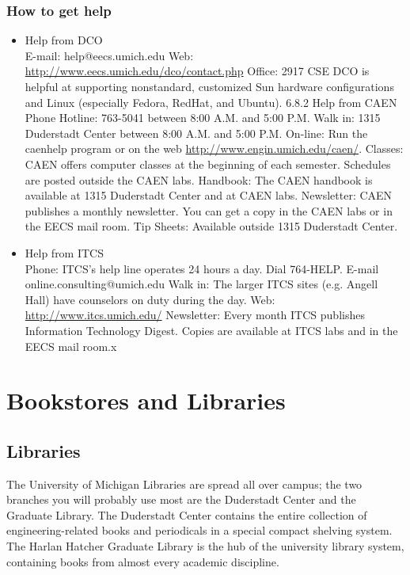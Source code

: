 \documentclass[11pt]{article}
\begin{document}
\subsubsection{How to get help}
\label{sec-7_1_9}
\begin{itemize}

\item Help from DCO\\
\label{sec-7_1_9_1}%
E-mail: help@eecs.umich.edu
Web:    \href{http://www.eecs.umich.edu/dco/contact.php}{http://www.eecs.umich.edu/dco/contact.php}
Office: 2917 CSE
DCO is helpful at supporting nonstandard, customized Sun hardware configurations and Linux (especially Fedora, RedHat, and Ubuntu).
6.8.2 Help from CAEN
Phone Hotline:  763-5041 between 8:00 A.M. and 5:00 P.M.
Walk in:        1315 Duderstadt Center between 8:00 A.M. and 5:00 P.M.
On-line:        Run the caenhelp program or on the web \href{http://www.engin.umich.edu/caen/}{http://www.engin.umich.edu/caen/}.
Classes:        CAEN offers computer classes at the beginning of each semester. Schedules are posted outside the CAEN labs.
Handbook:       The CAEN handbook is available at 1315 Duderstadt Center and at CAEN labs.
Newsletter:     CAEN publishes a monthly newsletter. You can get a copy in the CAEN labs or in the EECS mail room.
Tip Sheets:     Available outside 1315 Duderstadt Center.

\item Help from ITCS\\
\label{sec-7_1_9_2}%
Phone:  ITCS's help line operates 24 hours a day.  Dial 764-HELP.
E-mail  online.consulting@umich.edu
Walk in:        The larger ITCS sites (e.g. Angell Hall) have counselors on duty during the day.
Web:    \href{http://www.itcs.umich.edu/}{http://www.itcs.umich.edu/}
Newsletter:     Every month ITCS publishes Information Technology Digest. Copies are available at ITCS labs and in the EECS mail room.x
\end{itemize} %
\section{Bookstores and Libraries}
\label{sec-8}
\subsection{Libraries}
\label{sec-8_1}

The University of Michigan Libraries are spread all over campus; the
two branches you will probably use most are the Duderstadt Center and
the Graduate Library.  The Duderstadt Center contains the entire
collection of engineering-related books and periodicals in a special
compact shelving system.  The Harlan Hatcher Graduate Library is the
hub of the university library system, containing books from almost
every academic discipline.
\end{document}
